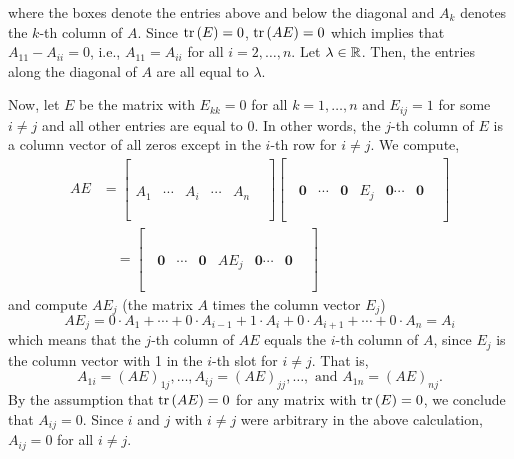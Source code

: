 \documentclass{article}
\begin{document}
where the boxes denote the entries above and below the diagonal and $A_k$ denotes the $k$-th column of $A$. Since $\text{tr}\left({E}\right) = 0$, $\text{tr}\left({AE}\right) = 0$ which implies that $A_{11} - A_{ii} = 0$, i.e., $A_{11} = A_{ii}$ for all $i = 2, \dots, n$. Let $\lambda \in \mathbb R$. Then, the entries along the diagonal of $A$ are all equal to $\lambda$. 
	
Now, let $E$ be the matrix with $E_{kk} = 0$ for all $k = 1, \dots, n$ and $E_{ij} = 1$ for some $i\neq j$ and all other entries are equal to 0. In other words, the $j$-th column of $E$ is a column vector of all zeros except in the $i$-th row for $i\neq j$. We compute,
	\begin{align*} 
		AE & =  
		\begin{bmatrix}
			& \\\\
			& \\\\
			A_1 & \cdots & A_i & \cdots & A_n
			& \\\\\\
			&
		\end{bmatrix}
		\begin{bmatrix}
			& \\\\
			& \\\\
			\;\;\mathbf 0 & \cdots & \mathbf 0& E_j & \mathbf 0 \cdots & \mathbf 0
			& \\\\\\
			&
		\end{bmatrix}\\
		& \quad =  \begin{bmatrix}
			& \\\\
			& \\\\
			\;\;\mathbf 0 & \cdots & \mathbf 0& AE_j & \mathbf 0 \cdots & \mathbf 0
			& \\\\\\
			&
		\end{bmatrix}
	\end{align*}
and compute $AE_j$ (the matrix $A$ times the column vector $E_j$) 
	\[AE_j = 0\cdot A_1 + \cdots + 0 \cdot A_{i-1} + 1\cdot A_i + 0\cdot A_{i+1} + \cdots + 0\cdot A_n = A_i\]
which means that the $j$-th column of $AE$ equals the $i$-th column of $A$, since $E_j$ is the column vector with 1 in the $i$-th slot for $i\neq j$. That is, 
	\[A_{1i} = (AE)_{1j}, \dots, A_{ij} = (AE)_{jj}, \dots, \text{ and } A_{1n} = (AE)_{nj}.\]
	 By the assumption that $\text{tr}\left({AE}\right) = 0$ for any matrix with $\text{tr}\left({E}\right) = 0$, we conclude that $A_{ij} = 0$. Since $i$ and $j$ with $i\neq j$ were arbitrary in the above calculation, $A_{ij} = 0$ for all $i\neq j$. 
\end{document}
